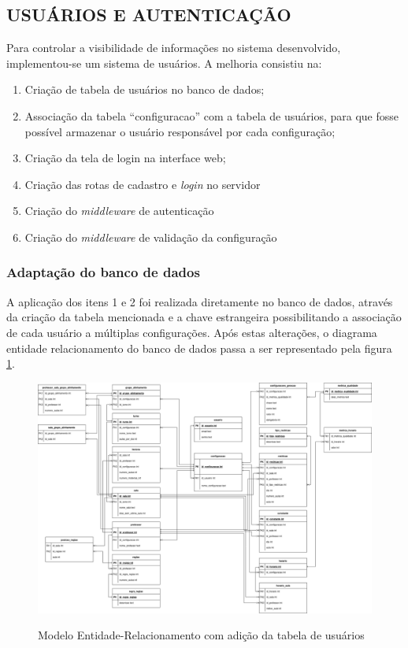 \clearpage
\subsection{USUÁRIOS E AUTENTICAÇÃO}

Para controlar a visibilidade de informações no sistema desenvolvido, implementou-se um sistema de usuários. A melhoria consistiu na:

\begin{enumerate}
	\item Criação de tabela de usuários no banco de dados;
	\item Associação da tabela ``configuracao'' com a tabela de usuários, para que fosse possível armazenar o usuário responsável por cada configuração;
	\item Criação da tela de login na interface web;
	\item Criação das rotas de cadastro e \textit{login} no servidor
	\item Criação do \textit{middleware} de autenticação
	\item Criação do \textit{middleware} de validação da configuração
\end{enumerate}

\subsubsection{Adaptação do banco de dados}
A aplicação dos itens 1 e 2 foi realizada diretamente no banco de dados, através da criação da tabela mencionada e a chave estrangeira possibilitando a associação de cada usuário a múltiplas configurações. Após estas alterações, o diagrama entidade relacionamento do banco de dados passa a ser representado pela figura \ref{fig:er_atualizado}.

\begin{figure}[!htb]
	\centering
	\caption{Modelo Entidade-Relacionamento com adição da tabela de usuários}
	\includegraphics[width=1\textwidth]{./dados/figuras/ER_horario_INCREMENTO5}
	\label{fig:er_atualizado}
\end{figure}

